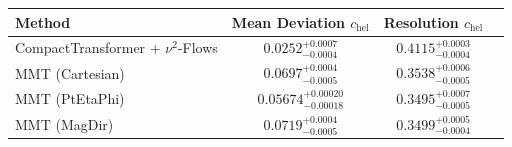     \begin{tabular}{lccc}
        \toprule
        Method & Mean Deviation $c_{\text{hel}}$ & Resolution $c_{\text{hel}}$ \\
        \midrule
        CompactTransformer + $\nu^2$-Flows & $0.0252^{+0.0007}_{-0.0004}$ & $0.4115^{+0.0003}_{-0.0004}$ \\
        MMT (Cartesian) & $0.0697^{+0.0004}_{-0.0005}$ & $0.3538^{+0.0006}_{-0.0005}$ \\
        MMT (PtEtaPhi) & $0.05674^{+0.00020}_{-0.00018}$ & $0.3495^{+0.0007}_{-0.0005}$ \\
        MMT (MagDir) & $0.0719^{+0.0004}_{-0.0005}$ & $0.3499^{+0.0005}_{-0.0004}$ \\
        \bottomrule
    \end{tabular}
